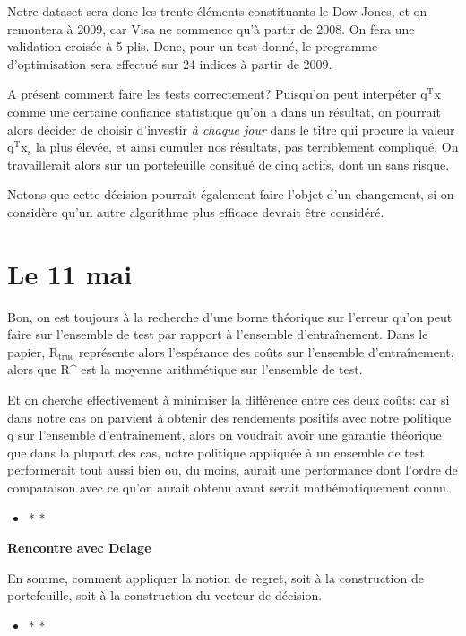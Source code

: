 \documentclass[11pt]{article}
\begin{document}
Notre dataset sera donc les trente éléments constituants le Dow Jones, et on remontera à
2009, car Visa ne commence qu'à partir de 2008. On fera une validation croisée à 5
plis. Donc, pour un test donné, le programme d'optimisation sera effectué sur 24 indices à
partir de 2009.

A présent comment faire les tests correctement? Puisqu'on peut interpéter q$^{\text{T}}$x comme une
certaine confiance statistique qu'on a dans un résultat, on pourrait alors décider de
choisir d'investir \emph{à chaque jour} dans le titre qui procure la valeur q$^{\text{T}}$x$_{\text{s}}$ la plus élevée,
et ainsi cumuler nos résultats, pas terriblement compliqué. On travaillerait alors sur un
portefeuille consitué de cinq actifs, dont un sans risque. 

Notons que cette décision pourrait également faire l'objet d'un changement, si on
considère qu'un autre algorithme plus efficace devrait être considéré.


\section{\textbf{Le 11 mai}}
\label{sec-7}

Bon, on est toujours à la recherche d'une borne théorique sur l'erreur qu'on peut faire
sur l'ensemble de test par rapport à l'ensemble d'entraînement. Dans le papier, R$_{\text{true}}$
représente alors l'espérance des coûts sur l'ensemble d'entraînement, alors que R\^{} est la
moyenne arithmétique sur l'ensemble de test. 

Et on cherche effectivement à minimiser la différence entre ces deux coûts: car si dans
notre cas on parvient à obtenir des rendements positifs avec notre politique q sur
l'ensemble d'entrainement, alors on voudrait avoir une garantie théorique que dans la
plupart des cas, notre politique appliquée à un ensemble de test performerait tout aussi
bien ou, du moins, aurait une performance dont l'ordre de comparaison avec ce qu'on aurait
obtenu avant serait mathématiquement connu.

\begin{itemize}
\item * *
\end{itemize}

\textbf{Rencontre avec Delage}

En somme, comment appliquer la notion de regret, soit à la construction de portefeuille,
soit à la construction du vecteur de décision. 

\begin{itemize}
\item * *
\end{itemize}
\end{document}
